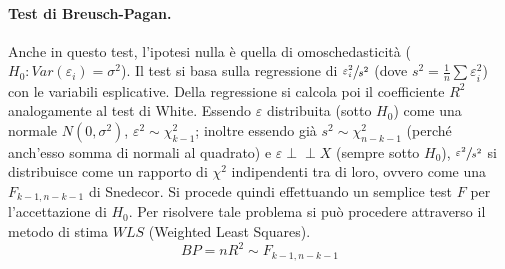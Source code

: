 \documentclass[a4page, 11pt]{article} %
\def\indep{\perp \!\!\! \perp }   %
\begin{document}
\paragraph{Test di Breusch-Pagan.} Anche in questo test, l’ipotesi nulla è quella di omoschedasticità ($H_0: Var(\varepsilon_i) = \sigma^2$).
Il test si basa sulla regressione di $\sfrac{\varepsilon^2_i}{s^2}$ (dove $s^2 = \frac{1}{n}\sum{\varepsilon_i^2}$) con le variabili esplicative.
Della regressione si calcola poi il coefficiente $R^2$ analogamente al test di White.
Essendo  $\varepsilon$ distribuita (sotto $H_0$) come una normale $N(0, \sigma^2)$, $\varepsilon^2 \sim \chi^2_{k-1}$; inoltre essendo già $s^2 \sim \chi^2_{n-k-1}$ (perché anch'esso somma di normali al quadrato) e $\varepsilon \indep X$ (sempre sotto $H_0$), $\sfrac{\varepsilon^2}{s^2}$ si distribuisce come un rapporto di $\chi^2$ indipendenti tra di loro, ovvero come una $F_{k-1, n-k-1}$ di Snedecor.
Si procede quindi effettuando un semplice test $F$ per l'accettazione di $H_0$.
Per risolvere tale problema si può procedere attraverso il metodo di stima $WLS$ (Weighted Least Squares).
\begin{equation*}
  BP = nR^2 \sim F_{k-1, n-k-1}
\end{equation*}
\end{document}
